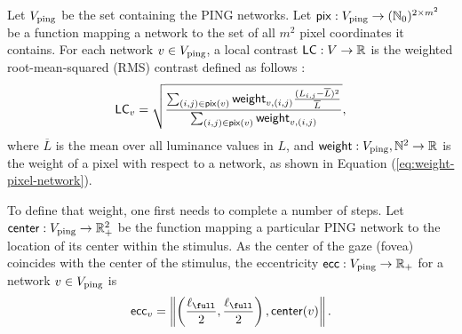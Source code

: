 Let $V_{\mathrm{ping}}$ be the set containing the PING networks. Let $\mathsf{pix}: V_{\mathrm{ping}} \to (\mathbb{N}_0)^{2 \times m^2}$ be a function mapping a network to the set of all $m^2$ pixel coordinates it contains.
For each network $v \in V_{\mathrm{ping}}$, a local contrast $\mathsf{LC}: V \to \mathbb{R}$ is the weighted root-mean-squared (RMS) contrast defined as follows \cite{Frazor2006}:
\begin{equation}
    \mathsf{LC}_v = \sqrt{
        \frac{
            \sum_{(i, j) \in \mathsf{pix}(v)} \mathsf{weight}_{v, (i, j)} \frac{(L_{i, j} - \overline{L})^2}{\overline{L}}
        }{
            \sum_{(i, j) \in \mathsf{pix}(v)} \mathsf{weight}_{v, (i, j)}
        }
    },
\end{equation}
where $\overline{L}$ is the mean over all luminance values in $L$, and $\mathsf{weight}: V_{\mathrm{ping}}, \mathbb{N}^2 \to \mathbb{R}$ is the weight of a pixel with respect to a network, as shown in Equation (\ref{eq:weight-pixel-network}). 

To define that weight, one first needs to complete a number of steps.
Let $\mathsf{center} : V_{\mathrm{ping}} \to \mathbb{R}_+^2$ be the function mapping a particular PING network to the  location of its center within the stimulus. As the center of the gaze (fovea) coincides with the center of the stimulus, the eccentricity $\mathsf{ecc}: V_{\mathrm{ping}} \to \mathbb{R}_+$ for a network $v \in V_{\mathrm{ping}}$ is
\begin{equation}
    \ecc_{v} = \left\| \left( \frac{\ell_\full}{2}, \frac{\ell_\full}{2} \right), \centr(v) \right\|.
\end{equation}

